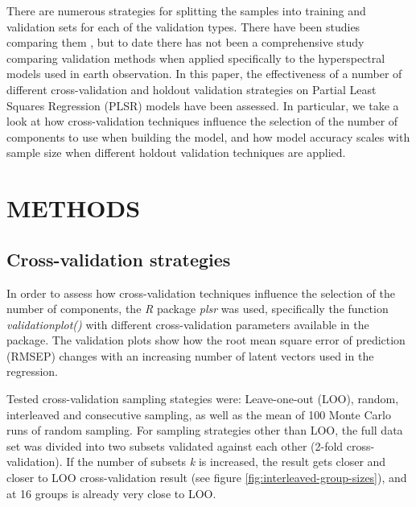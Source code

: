 \documentclass{isprs}
\begin{document}
There are numerous strategies for splitting the samples into training and validation sets for each of the validation types. There have been studies comparing them \cite{clark2003boosted}, but to date there has not been a comprehensive study comparing validation methods when applied specifically to the hyperspectral models used in earth observation. In this paper, the effectiveness of a number of different cross-validation and holdout validation strategies on Partial Least Squares Regression (PLSR) models have been assessed. In particular, we take a look at how cross-validation techniques influence the selection of the number of components to use when building the model, and how model accuracy scales with sample size when different holdout validation techniques are applied.

\section{METHODS}\label{sec:METHODS}

\subsection{Cross-validation strategies}\label{sec:Cross-validation strategies}

In order to assess how cross-validation techniques influence the selection of the number of components, the \textit{R} package \textit{plsr} was used, specifically the function \textit{validationplot()} with different cross-validation parameters available in the package. The validation plots show how the root mean square error of prediction (RMSEP) changes with an increasing number of latent vectors used in the regression.

Tested cross-validation sampling stategies were: Leave-one-out (LOO), random, interleaved and consecutive sampling, as well as the mean of 100 Monte Carlo runs of random sampling. For sampling strategies other than LOO, the full data set was divided into two subsets validated against each other (2-fold cross-validation). If the number of subsets \textit{k} is increased, the result gets closer and closer to LOO cross-validation result (see figure \ref{fig:interleaved-group-sizes}), and at 16 groups is already very close to LOO.
\end{document}
